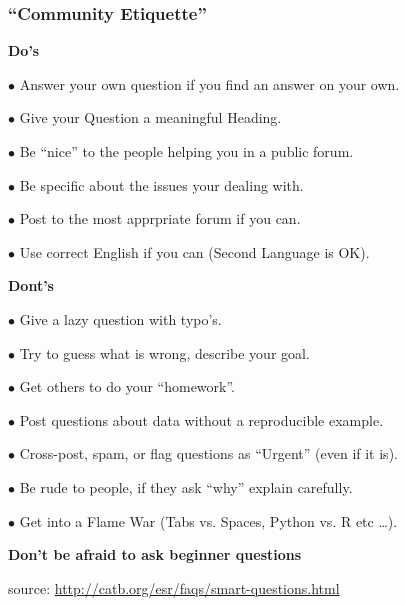 \documentclass{beamer}
\begin{document}
    \begin{frame}[shrink=15]
    \frametitle{``Community Etiquette''}
    
     \begin{center}
      \textbf{Do's}
     \end{center}
     
    $\bullet$ Answer your own question if you find an answer on your own.

    $\bullet$ Give your Question a meaningful Heading.

    $\bullet$ Be ``nice'' to the people helping you in a public forum.

    $\bullet$ Be specific about the issues your dealing with.
    
    $\bullet$ Post to the most apprpriate forum if you can.
    
    $\bullet$ Use correct English if you can (Second Language is OK).
    
     \begin{center}
      \textbf{Dont's}
     \end{center}
     
    $\bullet$ Give a lazy question with typo's.

    $\bullet$ Try to guess what is wrong, describe your goal.

    $\bullet$ Get others to do your ``homework''.

    $\bullet$ Post questions about data without a reproducible example.
    
    $\bullet$ Cross-post, spam, or flag questions as ``Urgent'' (even if it is).
    
    $\bullet$ Be rude to people, if they ask ``why'' explain carefully.
    
    $\bullet$ Get into a Flame War (Tabs vs. Spaces, Python vs. R etc \ldots ).
    
     \begin{center}
      \textbf{Don't be afraid to ask beginner questions}
     \end{center}
     
     source: \url{http://catb.org/esr/faqs/smart-questions.html}
     
     \end{frame}
  
\end{document}
